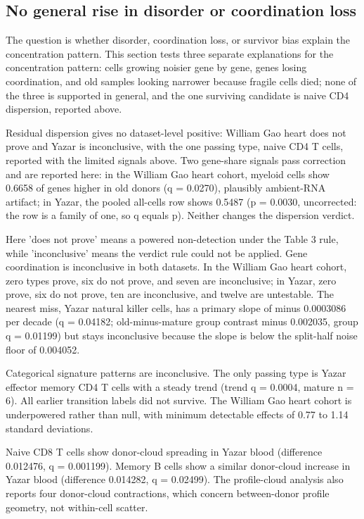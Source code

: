 \documentclass[11pt]{article}
\begin{document}
\subsection*{No general rise in disorder or coordination loss}

The question is whether disorder, coordination loss, or survivor bias explain the concentration pattern. This section tests three separate explanations for the concentration pattern: cells growing noisier gene by gene, genes losing coordination, and old samples looking narrower because fragile cells died; none of the three is supported in general, and the one surviving candidate is naive CD4 dispersion, reported above.

Residual dispersion gives no dataset-level positive: William Gao heart does not prove and Yazar is inconclusive, with the one passing type, naive CD4 T cells, reported with the limited signals above. Two gene-share signals pass correction and are reported here: in the William Gao heart cohort, myeloid cells show 0.6658 of genes higher in old donors (q = 0.0270), plausibly ambient-RNA artifact; in Yazar, the pooled all-cells row shows 0.5487 (p = 0.0030, uncorrected: the row is a family of one, so q equals p). Neither changes the dispersion verdict.

Here 'does not prove' means a powered non-detection under the Table 3 rule, while 'inconclusive' means the verdict rule could not be applied. Gene coordination is inconclusive in both datasets. In the William Gao heart cohort, zero types prove, six do not prove, and seven are inconclusive; in Yazar, zero prove, six do not prove, ten are inconclusive, and twelve are untestable. The nearest miss, Yazar natural killer cells, has a primary slope of minus 0.0003086 per decade (q = 0.04182; old-minus-mature group contrast minus 0.002035, group q = 0.01199) but stays inconclusive because the slope is below the split-half noise floor of 0.004052.

Categorical signature patterns are inconclusive. The only passing type is Yazar effector memory CD4 T cells with a steady trend (trend q = 0.0004, mature n = 6). All earlier transition labels did not survive. The William Gao heart cohort is underpowered rather than null, with minimum detectable effects of 0.77 to 1.14 standard deviations.

Naive CD8 T cells show donor-cloud spreading in Yazar blood (difference 0.012476, q = 0.001199). Memory B cells show a similar donor-cloud increase in Yazar blood (difference 0.014282, q = 0.02499). The profile-cloud analysis also reports four donor-cloud contractions, which concern between-donor profile geometry, not within-cell scatter.
\end{document}
